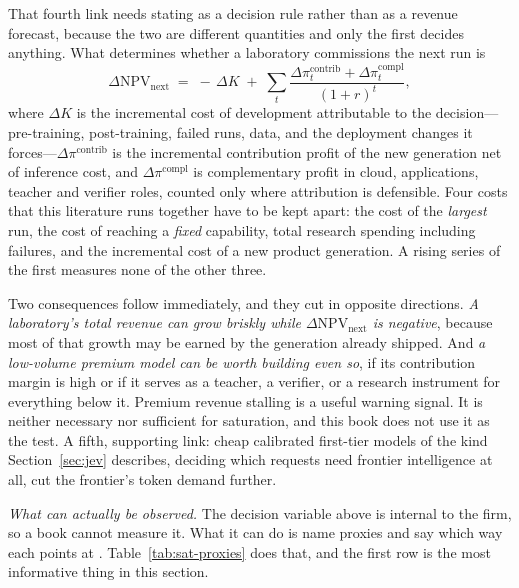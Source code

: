 That fourth link needs stating as a decision rule rather than as a revenue forecast, because the two are different quantities and only the first decides anything. What determines whether a laboratory commissions the next run is
\[
\Delta\mathrm{NPV}_{\text{next}} \;=\; -\,\Delta K \;+\; \sum_{t}\frac{\Delta\pi^{\text{contrib}}_{t} + \Delta\pi^{\text{compl}}_{t}}{(1+r)^{t}},
\]
where $\Delta K$ is the incremental cost of development attributable to the decision---pre-training, post-training, failed runs, data, and the deployment changes it forces---$\Delta\pi^{\text{contrib}}$ is the incremental contribution profit of the new generation net of inference cost, and $\Delta\pi^{\text{compl}}$ is complementary profit in cloud, applications, teacher and verifier roles, counted only where attribution is defensible. Four costs that this literature runs together have to be kept apart: the cost of the \emph{largest} run, the cost of reaching a \emph{fixed} capability, total research spending including failures, and the incremental cost of a new product generation. A rising series of the first measures none of the other three.

Two consequences follow immediately, and they cut in opposite directions. \emph{A laboratory's total revenue can grow briskly while $\Delta\mathrm{NPV}_{\text{next}}$ is negative}, because most of that growth may be earned by the generation already shipped. And \emph{a low-volume premium model can be worth building even so}, if its contribution margin is high or if it serves as a teacher, a verifier, or a research instrument for everything below it. Premium revenue stalling is a useful warning signal. It is neither necessary nor sufficient for saturation, and this book does not use it as the test. A fifth, supporting link: cheap calibrated first-tier models of the kind Section~\ref{sec:jev} describes, deciding which requests need frontier intelligence at all, cut the frontier's token demand further.

\emph{What can actually be observed.} The decision variable above is internal to the firm, so a book cannot measure it. What it can do is name proxies and say which way each points at \datafreeze. Table~\ref{tab:sat-proxies} does that, and the first row is the most informative thing in this section.

